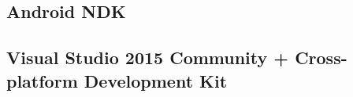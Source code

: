 		
		
		\subsection{Android NDK}
		\label{t:technologie:narzedzia:ndk}
		
		
		\subsection{Visual Studio 2015 Community + Cross-platform Development Kit}
		\label{t:technologie:narzedzia:vs}
		
		
		







